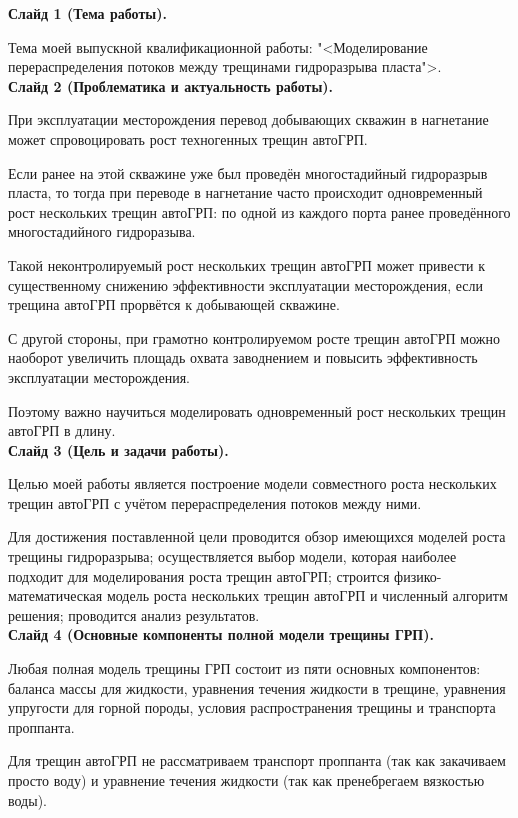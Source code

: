 \documentclass[a4paper, 12pt]{article}
\begin{document}

\textbf{Слайд 1 (Тема работы).}

Тема моей выпускной квалификационной работы: "<Моделирование перераспределения потоков между трещинами гидроразрыва пласта">.
\\


\textbf{Слайд 2 (Проблематика и актуальность работы).}

При эксплуатации месторождения перевод добывающих скважин в нагнетание может спровоцировать рост техногенных трещин автоГРП.

Если ранее на этой скважине уже был проведён многостадийный гидроразрыв пласта, то тогда при переводе в нагнетание часто происходит одновременный рост нескольких трещин автоГРП: по одной из каждого порта ранее проведённого многостадийного гидроразыва.

Такой неконтролируемый рост нескольких трещин автоГРП может привести к существенному снижению эффективности эксплуатации месторождения, если трещина автоГРП прорвётся к добывающей скважине.

С другой стороны, при грамотно контролируемом росте трещин автоГРП можно наоборот увеличить площадь охвата заводнением и повысить эффективность эксплуатации месторождения.

Поэтому важно научиться моделировать одновременный рост нескольких трещин автоГРП в длину.
\\ 


\textbf{Слайд 3 (Цель и задачи работы).}

Целью моей работы является построение модели совместного роста нескольких трещин автоГРП с учётом перераспределения потоков между ними.

Для достижения поставленной цели проводится обзор имеющихся моделей роста трещины гидроразрыва;
осуществляется выбор модели, которая наиболее подходит для моделирования роста трещин автоГРП;
строится физико-математическая модель роста нескольких трещин автоГРП и численный алгоритм решения;
проводится анализ результатов.
\\


\textbf{Слайд 4 (Основные компоненты полной модели трещины ГРП).}

Любая полная модель трещины ГРП состоит из пяти основных компонентов: баланса массы для жидкости, уравнения течения жидкости в трещине, уравнения упругости для горной породы, условия распространения трещины и транспорта проппанта.

Для трещин автоГРП не рассматриваем транспорт проппанта (так как закачиваем просто воду) и уравнение течения жидкости (так как пренебрегаем вязкостью воды).
\end{document}
